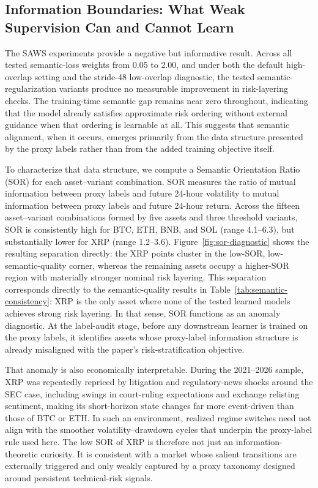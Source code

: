 \documentclass[a4paper,fleqn]{cas-dc}
\begin{document}
\subsection{Information Boundaries: What Weak Supervision Can and Cannot Learn}
The SAWS experiments provide a negative but informative result. Across all tested semantic-loss weights from 0.05 to 2.00, and under both the default high-overlap setting and the stride-48 low-overlap diagnostic, the tested semantic-regularization variants produce no measurable improvement in risk-layering checks. The training-time semantic gap remains near zero throughout, indicating that the model already satisfies approximate risk ordering without external guidance when that ordering is learnable at all. This suggests that semantic alignment, when it occurs, emerges primarily from the data structure presented by the proxy labels rather than from the added training objective itself.

To characterize that data structure, we compute a Semantic Orientation Ratio (SOR) for each asset--variant combination. SOR measures the ratio of mutual information between proxy labels and future 24-hour volatility to mutual information between proxy labels and future 24-hour return. Across the fifteen asset--variant combinations formed by five assets and three threshold variants, SOR is consistently high for BTC, ETH, BNB, and SOL (range 4.1--6.3), but substantially lower for XRP (range 1.2--3.6). Figure~\ref{fig:sor-diagnostic} shows the resulting separation directly: the XRP points cluster in the low-SOR, low-semantic-quality corner, whereas the remaining assets occupy a higher-SOR region with materially stronger nominal risk layering. This separation corresponds directly to the semantic-quality results in Table~\ref{tab:semantic-consistency}: XRP is the only asset where none of the tested learned models achieves strong risk layering. In that sense, SOR functions as an anomaly diagnostic. At the label-audit stage, before any downstream learner is trained on the proxy labels, it identifies assets whose proxy-label information structure is already misaligned with the paper's risk-stratification objective.

That anomaly is also economically interpretable. During the 2021--2026 sample, XRP was repeatedly repriced by litigation and regulatory-news shocks around the SEC case, including swings in court-ruling expectations and exchange relisting sentiment, making its short-horizon state changes far more event-driven than those of BTC or ETH. In such an environment, realized regime switches need not align with the smoother volatility--drawdown cycles that underpin the proxy-label rule used here. The low SOR of XRP is therefore not just an information-theoretic curiosity. It is consistent with a market whose salient transitions are externally triggered and only weakly captured by a proxy taxonomy designed around persistent technical-risk signals.
\end{document}
